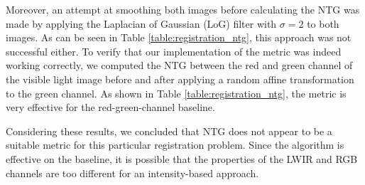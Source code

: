\documentclass{l4proj}
\begin{document}
Moreover, an attempt at smoothing both images before calculating the NTG was made by applying the Laplacian of Gaussian (LoG) filter with $\sigma=2$ to both images. As can be seen in Table \ref{table:registration_ntg}, this approach was not successful either. To verify that our implementation of the metric was indeed working correctly, we computed the NTG between the red and green channel of the visible light image before and after applying a random affine transformation to the green channel. As shown in Table \ref{table:registration_ntg}, the metric is very effective for the red-green-channel baseline. 

Considering these results, we concluded that NTG does not appear to be a suitable metric for this particular registration problem. Since the algorithm is effective on the baseline, it is possible that the properties of the LWIR and RGB channels are too different for an intensity-based approach.
\end{document}

